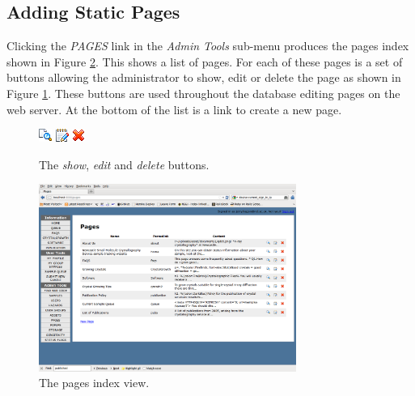 \documentclass[12pt,twoside]{article}
\begin{document}
\subsection{Adding Static Pages}\label{sec:static}
Clicking the \emph{PAGES} link in the \emph{Admin Tools} sub-menu 
produces the pages index shown in Figure \ref{fig:pageidx}.
This shows a list of pages. For each of these pages is a set of buttons
allowing the administrator to show, edit or delete the page as shown in
Figure \ref{fig:showeditdelete}.
These buttons are used throughout the database editing pages on the web server.
At the bottom of the list is a link to create a new page.

\begin{figure}[!h]
\begin{center}
\includegraphics{show}\quad
\includegraphics{edit}\quad
\includegraphics{delete}
\end{center}
\caption{The \emph{show}, \emph{edit} and \emph{delete} buttons.
\label{fig:showeditdelete}}
\end{figure}

\begin{figure}[!h]
\begin{center}
\includegraphics[width=0.75\textwidth]{pageidx}
\caption{The pages index view.\label{fig:pageidx}}
\end{center}
\end{figure}
\end{document}
